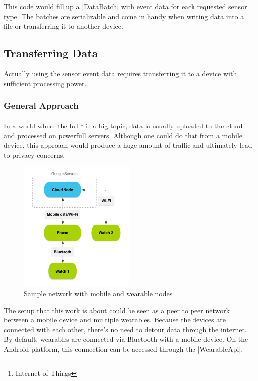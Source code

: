 This code would fill up a |DataBatch| with event data for each requested sensor type.
The batches are serializable and come in handy when writing data into a file or transferring it to another device.

\subsection{Transferring Data}
Actually using the sensor event data requires transferring it to a device with sufficient processing power.

\subsubsection{General Approach}
In a world where the IoT\footnote{Internet of Things} is a big topic, data is usually uploaded to the cloud and processed on powerfull servers.
Although one could do that from a mobile device, this approach would produce a huge amount of traffic and ultimately lead to privacy concerns.

\begin{figure}[H]
	\centering
	\includegraphics[width=0.5\textwidth]{images/wear_cloud_node.png}
	\caption[Caption for wear_cloud_node]{Sample network with mobile and wearable nodes\footnotemark}
	\label{fig:nodeNetwork}
\end{figure}

The setup that this work is about could be seen as a peer to peer network between a mobile device and multiple wearables.
Because the devices are connected with each other, there's no need to detour data through the internet.
By default, wearables are connected via Bluetooth with a mobile device.
On the Android platform, this connection can be accessed through the |WearableApi|\cite{androiddocs:wearable}.

